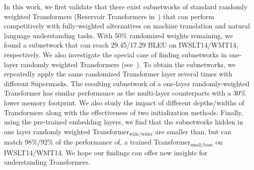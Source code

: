 In this work, we first validate that there exist subnetworks of standard randomly weighted Transformers (Reservoir Transformers in~\citep{shen2020reservoir}) that can perform competitively with fully-weighted alternatives on machine translation and natural language understanding tasks. 
With 50\% randomized weights remaining, we found a subnetwork that can reach 29.45/17.29 BLEU on IWSLT14/WMT14, respectively. 
We also investigate the special case of finding subnetworks in one-layer randomly weighted Transformers (see~). 
To obtain the subnetworks, we repeatedly apply the same randomized Transformer layer several times with different Supermasks. 
The resulting subnetwork of a one-layer randomly-weighted Transformer has similar performance as the multi-layer counterparts with a 30\% lower memory footprint. 
We also study the impact of different depths/widths of Transformers along with the effectiveness of two initialization methods. 
Finally, using the pre-trained embedding layers, we find that the subnetworks hidden in one layer randomly weighted Transformer$_\text{wide/wider}$ are smaller than, but can match 98\%/92\% of the performance of, a trained Transformer$_\text{small/base}$ on IWSLT14/WMT14. 
We hope our findings can offer new insights for understanding Transformers. 